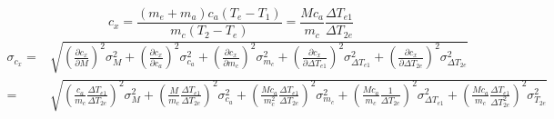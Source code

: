 \documentclass{article}
\begin{document}
	\[ 
	c_{x} = \frac{(m_{e} + m_{a})c_{a}(T_{e} - T_{1})}{m_{c}(T_{2}-T_{e})} = \frac{Mc_{a}}{m_{c}}\frac{\Delta T_{e1}}{\Delta T_{2e}}
	\]
	\begin{align*}
		\sigma_{c_{x}} =&  \sqrt{\left(\frac{\partial c_{x}}{\partial M}\right)^2\sigma_{M}^2 + \left(\frac{\partial c_{x}}{\partial c_{a}}\right)^2\sigma_{c_{a}}^2 + \left(\frac{\partial c_{x}}{\partial m_{c}}\right)^2\sigma_{m_{c}}^2+ \left(\frac{\partial c_{x}}{\partial\Delta T_{e1}}\right)^2\sigma_{\Delta T_{e1}}^2 + \left(\frac{\partial c_{x}}{\partial \Delta T_{2e}}\right)^2\sigma^2_{\Delta T_{2e}}} \\
		=& \sqrt{\left(\frac{c_{a}}{m_{c}}\frac{\Delta T_{e1}}{\Delta T_{2e}}\right)^2\sigma^2_{M} + \left( \frac{M}{m_{c}}\frac{\Delta T_{e1}}{\Delta T_{2e}} \right)^2\sigma_{c_{a}}^2 + \left(\frac{Mc_{a}}{m_{c}^2}\frac{\Delta T_{e1}}{\Delta T_{2e}}\right)^2 \sigma_{m_{c}}^2 + \left(\frac{Mc_{a}}{m_{c}}\frac{1}{\Delta T_{2e}}\right)^2\sigma_{\Delta T_{e1}}^2 + \left(\frac{Mc_{a}}{m_{c}}\frac{\Delta T_{e1}}{\Delta T_{2e}^2}\right)^2\sigma_{T_{2e}}^2}
	\end{align*}
	
	
\end{document}
